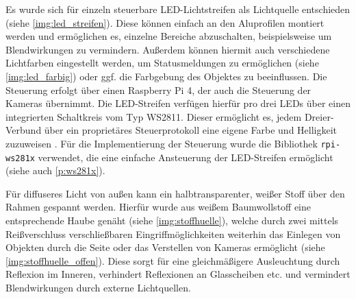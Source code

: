 \documentclass[./00PhotoBox.tex]{subfiles}
\begin{document}
Es wurde sich für einzeln steuerbare LED-Lichtstreifen als Lichtquelle entschieden (siehe \autoref{img:led_streifen}). Diese können einfach an den Aluprofilen montiert werden und ermöglichen es, einzelne Bereiche abzuschalten, beispielsweise um Blendwirkungen zu vermindern. Außerdem können hiermit auch verschiedene Lichtfarben eingestellt werden, um Statusmeldungen zu ermöglichen (siehe \autoref{img:led_farbig}) oder ggf. die Farbgebung des Objektes zu beeinflussen. Die Steuerung erfolgt über einen Raspberry Pi 4, der auch die Steuerung der Kameras übernimmt. Die LED-Streifen verfügen hierfür pro drei LEDs über einen integrierten Schaltkreis vom Typ WS2811. Dieser ermöglicht es, jedem Dreier-Verbund über ein proprietäres Steuerprotokoll eine eigene Farbe und Helligkeit zuzuweisen \citep[vgl.][]{ws2811}. Für die Implementierung der Steuerung wurde die Bibliothek \texttt{rpi-ws281x} verwendet, die eine einfache Ansteuerung der LED-Streifen ermöglicht (siehe auch \autoref{p:ws281x}).

Für diffuseres Licht von außen kann ein halbtransparenter, weißer Stoff über den Rahmen gespannt werden. Hierfür wurde aus weißem Baumwollstoff eine entsprechende Haube genäht (siehe \autoref{img:stoffhuelle}), welche durch zwei mittels Reißverschluss verschließbaren Eingriffmöglichkeiten weiterhin das Einlegen von Objekten durch die Seite oder das Verstellen von Kameras ermöglicht (siehe \autoref{img:stoffhuelle_offen}). Diese sorgt für eine gleichmäßigere Ausleuchtung durch Reflexion im Inneren, verhindert Reflexionen an Glasscheiben etc. und vermindert Blendwirkungen durch externe Lichtquellen.
\end{document}
